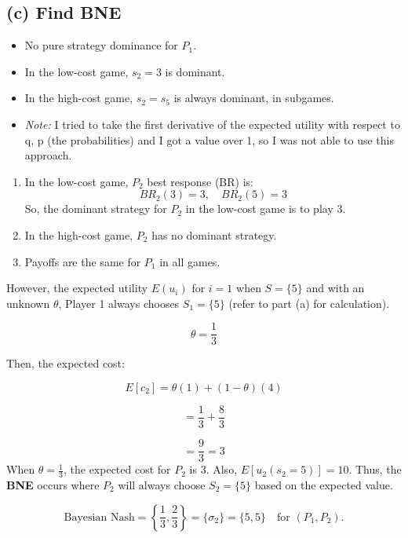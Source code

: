 \documentclass{article}
\begin{document}
\subsection*{(c) Find BNE}
\begin{itemize}
    \item No pure strategy dominance for \( P_1 \).
    \item In the low-cost game, \( s_2 = 3 \) is dominant.
    \item In the high-cost game, \( s_2 = s_5 \) is always dominant, in subgames.
    \item \textit{Note:} I tried to take the first derivative of the expected utility with respect to q, p (the probabilities) and I got a value over 1, so I was not able to use this approach. 
\end{itemize}

\begin{enumerate}
    \item In the low-cost game, \( P_2 \) best response (BR) is:
    \[
    BR_2(3) = 3, \quad BR_2(5) = 3
    \]
    So, the dominant strategy for \( P_2 \) in the low-cost game is to play 3.
    
    \item In the high-cost game, \( P_2 \) has no dominant strategy.
    
    \item Payoffs are the same for \( P_1 \) in all games.
\end{enumerate}
\vspace{2mm}
However, the expected utility \( E(u_i) \) for \( i=1 \) when \( S = \{5\} \) and with an unknown \( \theta \), Player 1 always chooses \( S_1 = \{5\} \) (refer to part (a) for calculation).

\[
\theta = \frac{1}{3}
\]

Then, the expected cost:

\[
E[c_2] = \theta(1) + (1-\theta)(4)
\]

\[
= \frac{1}{3} + \frac{8}{3}
\]

\[
= \frac{9}{3} = 3
\]
\vspace{2mm}
When \( \theta = \frac{1}{3} \), the expected cost for \( P_2 \) is 3. Also, \( E[u_2(s_2 = 5)] = 10 \). 
\vspace{2mm}
Thus, the \textbf{BNE} occurs where \( P_2 \) will always choose \( S_2 = \{5\} \) based on the expected value.

\[
\text{Bayesian Nash} = \left\{ \frac{1}{3}, \frac{2}{3} \right\} = \{ \sigma_2 \} = \{ 5, 5 \} \quad \text{for } (P_1, P_2).
\]
\end{document}
